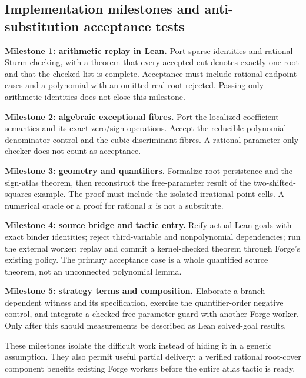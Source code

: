 \subsection{Implementation milestones and anti-substitution acceptance tests}
\textbf{Milestone 1: arithmetic replay in Lean.} Port sparse identities and rational Sturm checking, with a theorem that every accepted cut denotes exactly one root and that the checked list is complete. Acceptance must include rational endpoint cases and a polynomial with an omitted real root rejected. Passing only arithmetic identities does not close this milestone.

\textbf{Milestone 2: algebraic exceptional fibres.} Port the localized coefficient semantics and its exact zero/sign operations. Accept the reducible-polynomial denominator control and the cubic discriminant fibres. A rational-parameter-only checker does not count as acceptance.

\textbf{Milestone 3: geometry and quantifiers.} Formalize root persistence and the sign-atlas theorem, then reconstruct the free-parameter result of the two-shifted-squares example. The proof must include the isolated irrational point cells. A numerical oracle or a proof for rational $x$ is not a substitute.

\textbf{Milestone 4: source bridge and tactic entry.} Reify actual Lean goals with exact binder identities; reject third-variable and nonpolynomial dependencies; run the external worker; replay and commit a kernel-checked theorem through Forge's existing policy. The primary acceptance case is a whole quantified source theorem, not an unconnected polynomial lemma.

\textbf{Milestone 5: strategy terms and composition.} Elaborate a branch-dependent witness and its specification, exercise the quantifier-order negative control, and integrate a checked free-parameter guard with another Forge worker. Only after this should measurements be described as Lean solved-goal results.

These milestones isolate the difficult work instead of hiding it in a generic  assumption. They also permit useful partial delivery: a verified rational root-cover component benefits existing Forge workers before the entire atlas tactic is ready.
